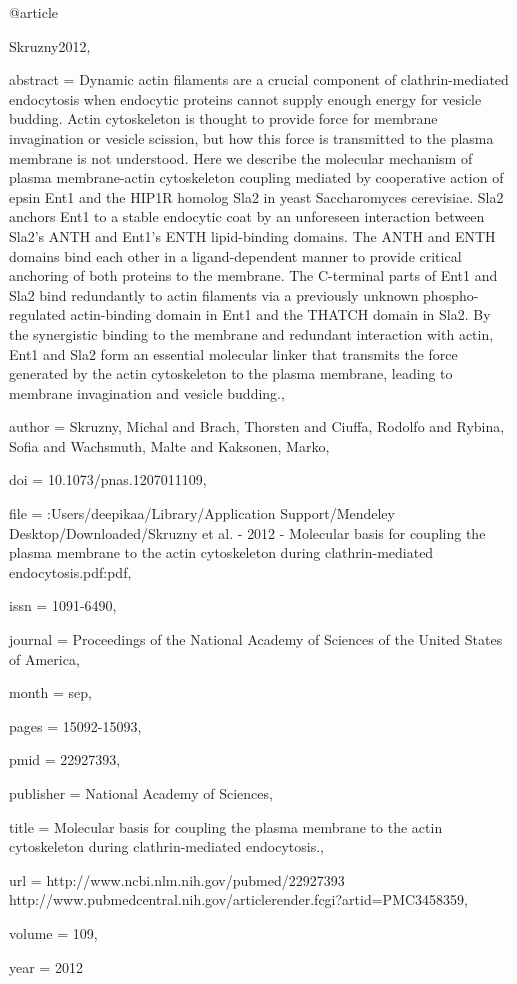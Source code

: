 @article{Skruzny2012,

abstract = {Dynamic actin filaments are a crucial component of clathrin-mediated endocytosis when endocytic proteins cannot supply enough energy for vesicle budding. Actin cytoskeleton is thought to provide force for membrane invagination or vesicle scission, but how this force is transmitted to the plasma membrane is not understood. Here we describe the molecular mechanism of plasma membrane-actin cytoskeleton coupling mediated by cooperative action of epsin Ent1 and the HIP1R homolog Sla2 in yeast Saccharomyces cerevisiae. Sla2 anchors Ent1 to a stable endocytic coat by an unforeseen interaction between Sla2's ANTH and Ent1's ENTH lipid-binding domains. The ANTH and ENTH domains bind each other in a ligand-dependent manner to provide critical anchoring of both proteins to the membrane. The C-terminal parts of Ent1 and Sla2 bind redundantly to actin filaments via a previously unknown phospho-regulated actin-binding domain in Ent1 and the THATCH domain in Sla2. By the synergistic binding to the membrane and redundant interaction with actin, Ent1 and Sla2 form an essential molecular linker that transmits the force generated by the actin cytoskeleton to the plasma membrane, leading to membrane invagination and vesicle budding.},

author = {Skruzny, Michal and Brach, Thorsten and Ciuffa, Rodolfo and Rybina, Sofia and Wachsmuth, Malte and Kaksonen, Marko},

doi = {10.1073/pnas.1207011109},

file = {:Users/deepikaa/Library/Application Support/Mendeley Desktop/Downloaded/Skruzny et al. - 2012 - Molecular basis for coupling the plasma membrane to the actin cytoskeleton during clathrin-mediated endocytosis.pdf:pdf},

issn = {1091-6490},

journal = {Proceedings of the National Academy of Sciences of the United States of America},

month = {sep},

pages = {15092-15093},

pmid = {22927393},

publisher = {National Academy of Sciences},

title = {{Molecular basis for coupling the plasma membrane to the actin cytoskeleton during clathrin-mediated endocytosis.}},

url = {http://www.ncbi.nlm.nih.gov/pubmed/22927393 http://www.pubmedcentral.nih.gov/articlerender.fcgi?artid=PMC3458359},

volume = {109},

year = {2012}

}

